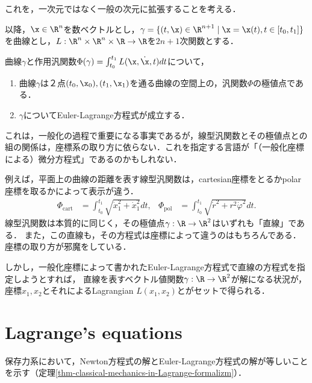 \documentclass[uplatex, 12pt, dvipdfmx]{jsreport}
\begin{document}
これを，一次元ではなく一般の次元に拡張することを考える．
\begin{notation}
    以降，$\x\in\R^n$を数ベクトルとし，$\gamma=\{(t,\x)\in\R^{n+1}\mid \x=\x(t),t\in[t_0,t_1]\}$を曲線とし，$L:\R^n\times\R^n\times\R\to\R$を$2n+1$次関数とする．
\end{notation}

\begin{theorem}
    曲線$\gamma$と作用汎関数$\Phi(\gamma)=\int^{t_1}_{t_0}L(\x,\dot{\x},t)dt$について，
    \begin{enumerate}
        \item 曲線$\gamma$は２点$(t_0,\x_0),(t_1,\x_1)$を通る曲線の空間上の，汎関数$\Phi$の極値点である．
        \item $\gamma$についてEuler-Lagrange方程式が成立する．
    \end{enumerate}
\end{theorem}
\begin{remark}\label{remark-generalized-coordinates}
    これは，一般化の過程で重要になる事実であるが，線型汎関数とその極値点との組の関係は，座標系の取り方に依らない．これを指定する言語が「（一般化座標による）微分方程式」であるのかもしれない．

    例えば，平面上の曲線の距離を表す線型汎関数は，cartesian座標をとるかpolar座標を取るかによって表示が違う．
    \begin{align*}
        \Phi_{\mathrm{cart}}&=\int^{t_1}_{t_0}\sqrt{\dot{x}_1^2+\dot{x}_1^2}dt, &\Phi_{\mathrm{pol}}&=\int^{t_1}_{t_0}\sqrt{\dot{r}^2+r^2\dot{\varphi}^2}dt.
    \end{align*}
    線型汎関数は本質的に同じく，その極値点$\gamma:\R\to\R^2$はいずれも「直線」である．
    また，この直線も，その方程式は座標によって違うのはもちろんである．
    座標の取り方が邪魔をしている．

    しかし，一般化座標によって書かれたEuler-Lagrange方程式で直線の方程式を指定しようとすれば，
    直線を表すベクトル値関数$\gamma:\R\to\R^2$が解になる状況が，
    座標$x_1,x_2$とそれによるLagrangian $L(x_1,x_2)$とがセットで得られる．
\end{remark}

\section{Lagrange's equations}

\begin{screen}
    保存力系において，Newton方程式の解とEuler-Lagrange方程式の解が等しいことを示す（定理\ref{thm-classical-mechanics-in-Lagrange-formalizm}）．
\end{screen}
\end{document}
